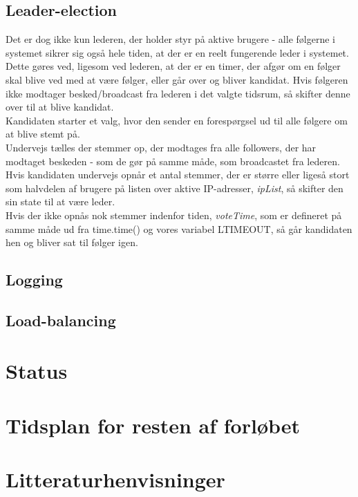 \documentclass[a4paper,12pt]{article}
\begin{document}
\subsection*{Leader-election}
Det er dog ikke kun lederen, der holder styr på aktive brugere - alle følgerne i systemet sikrer sig også hele tiden, at der er en reelt fungerende leder i systemet.
\\
Dette gøres ved, ligesom ved lederen, at der er en timer, der afgør om en følger skal blive ved med at være følger, eller går over og bliver kandidat. Hvis følgeren ikke modtager besked/broadcast fra lederen i det valgte tidsrum, så skifter denne over til at blive kandidat.
\\[5px]
Kandidaten starter et valg, hvor den sender en forespørgsel ud til alle følgere om at blive stemt på.
\\
Undervejs tælles der stemmer op, der modtages fra alle followers, der har modtaget beskeden - som de gør på samme måde, som broadcastet fra lederen. Hvis kandidaten undervejs opnår et antal stemmer, der er større eller ligeså stort som halvdelen af brugere på listen over aktive IP-adresser, \textit{ipList}, så skifter den sin state til at være leder.
\\
Hvis der ikke opnås nok stemmer indenfor tiden, \textit{voteTime}, som er defineret på samme måde ud fra time.time() og vores variabel LTIMEOUT, så går kandidaten hen og bliver sat til følger igen.


\subsection*{Logging}


\subsection*{Load-balancing}



\section*{Status}


\section*{Tidsplan for resten af forløbet}





\section*{Litteraturhenvisninger}
\end{document}
